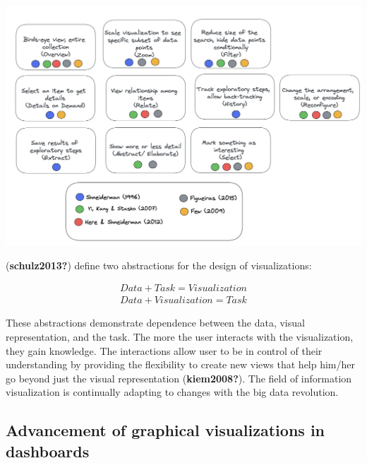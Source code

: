 \documentclass[print]{nuthesis}
\begin{document}
\begin{center}
\includegraphics[width=\textwidth]{figure/interactiontasks}
\end{center}

(\textbf{schulz2013?}) define two abstractions for the design of visualizations:

\begin{center}
\begin{align*}
  Data + Task = Visualization \\
  Data + Visualization = Task
\end{align*}
\end{center}

These abstractions demonstrate dependence between the data, visual representation, and the task. The more the user interacts with the visualization, they gain knowledge. The interactions allow user to be in control of their understanding by providing the flexibility to create new views that help him/her go beyond just the visual representation (\textbf{kiem2008?}). The field of information visualization is continually adapting to changes with the big data revolution.

\hypertarget{advancement-of-graphical-visualizations-in-dashboards}{%
\subsection{Advancement of graphical visualizations in dashboards}\label{advancement-of-graphical-visualizations-in-dashboards}}
\end{document}
